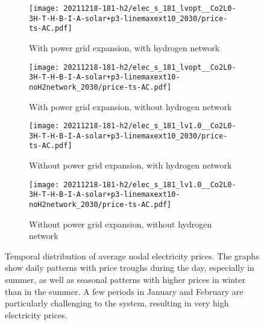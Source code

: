 \begin{figure}
    \begin{subfigure}{0.49\textwidth}
        \centering
        \caption{With power grid expansion, with hydrogen network}
        \texttt{[image: 20211218-181-h2/elec\_s\_181\_lvopt\_\_Co2L0-3H-T-H-B-I-A-solar+p3-linemaxext10\_2030/price-ts-AC.pdf]}
    \end{subfigure}
    \begin{subfigure}{0.49\textwidth}
        \centering
        \caption{With power grid expansion, without hydrogen network}
        \texttt{[image: 20211218-181-h2/elec\_s\_181\_lvopt\_\_Co2L0-3H-T-H-B-I-A-solar+p3-linemaxext10-noH2network\_2030/price-ts-AC.pdf]}
    \end{subfigure}
    \begin{subfigure}{0.49\textwidth}
        \centering
        \caption{Without power grid expansion, with hydrogen network}
        \texttt{[image: 20211218-181-h2/elec\_s\_181\_lv1.0\_\_Co2L0-3H-T-H-B-I-A-solar+p3-linemaxext10\_2030/price-ts-AC.pdf]}
    \end{subfigure}
    \begin{subfigure}{0.49\textwidth}
        \centering
        \caption{Without power grid expansion, without hydrogen network}
        \texttt{[image: 20211218-181-h2/elec\_s\_181\_lv1.0\_\_Co2L0-3H-T-H-B-I-A-solar+p3-linemaxext10-noH2network\_2030/price-ts-AC.pdf]}
    \end{subfigure}
    \caption{Temporal distribution of average nodal electricity prices. The graphs show daily patterns with price troughs during the day, especially in summer, as well as seasonal patterns with higher prices in winter than in the summer. A few periods in January and February are particularly challenging to the system, resulting in very high electricity prices.}
    \label{fig:si:lmp-ts-ac}
\end{figure}

